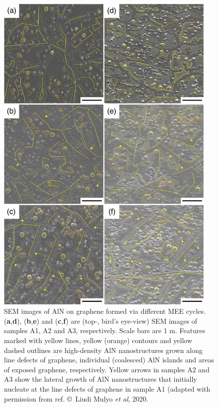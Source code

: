 \begin{figure} %
    \centering
    \includegraphics[width=0.95\textwidth]{figures/paper-iv/fig-1.png}
    \caption[SEM images of AlN on graphene formed via different MEE cycles]{SEM images of AlN on graphene formed via different MEE cycles. (\textbf{a},\textbf{d}), (\textbf{b},\textbf{e}) and (\textbf{c},\textbf{f}) are (top-, bird’s eye-view) SEM images of samples A1, A2 and A3, respectively. Scale bars are 1 {\textmu}m. Features marked with yellow lines, yellow (orange) contours and yellow dashed outlines are high-density AlN nanostructures grown along line defects of graphene, individual (coalesced) AlN islands and areas of exposed graphene, respectively. Yellow arrows in samples A2 and A3 show the lateral growth of AlN nanostructures that initially nucleate at the line defects of graphene in sample A1 (adapted with permission from ref.  \copyright \ Liudi Mulyo \textit{et al}, 2020.}
    \label{fig:figures/paper-iv/fig-1}
\end{figure}

